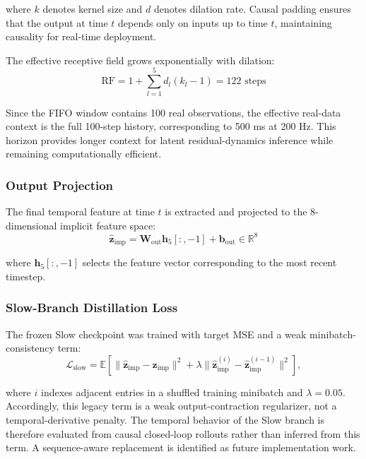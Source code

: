 \documentclass[letterpaper,journal]{IEEEtran}
\begin{document}
\noindent where $k$ denotes kernel size and $d$ denotes dilation rate. Causal padding ensures that the output at time $t$ depends only on inputs up to time $t$, maintaining causality for real-time deployment.

The effective receptive field grows exponentially with dilation:
\begin{equation}
\text{RF} = 1 + \sum_{l=1}^5 d_l (k_l - 1) = 122 \text{ steps} \label{eq:receptive_field}
\end{equation}

Since the FIFO window contains 100 real observations, the effective real-data context is the full 100-step history, corresponding to 500 ms at 200 Hz. This horizon provides longer context for latent residual-dynamics inference while remaining computationally efficient.

\subsubsection{Output Projection}

The final temporal feature at time $t$ is extracted and projected to the 8-dimensional implicit feature space:
\begin{equation}
\hat{\bm{z}}_{\text{imp}} = \bm{W}_{\text{out}} \bm{h}_5[:, -1] + \bm{b}_{\text{out}} \in \mathbb{R}^8 \label{eq:slow_output}
\end{equation}

\noindent where $\bm{h}_5[:, -1]$ selects the feature vector corresponding to the most recent timestep.

\subsubsection{Slow-Branch Distillation Loss}

The frozen Slow checkpoint was trained with target MSE and a weak minibatch-consistency term:
\begin{equation}
\mathcal{L}_{\text{slow}} = \mathbb{E} \left[ \|\hat{\bm{z}}_{\text{imp}} - \bm{z}_{\text{imp}}\|^2 + \lambda \|\hat{\bm{z}}_{\text{imp}}^{(i)} - \hat{\bm{z}}_{\text{imp}}^{(i-1)}\|^2 \right], \label{eq:slow_loss}
\end{equation}

\noindent where $i$ indexes adjacent entries in a shuffled training minibatch and $\lambda=0.05$. Accordingly, this legacy term is a weak output-contraction regularizer, not a temporal-derivative penalty. The temporal behavior of the Slow branch is therefore evaluated from causal closed-loop rollouts rather than inferred from this term. A sequence-aware replacement is identified as future implementation work.
\end{document}
